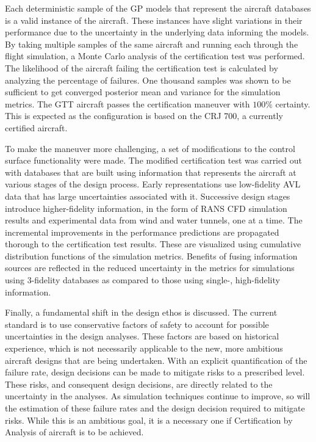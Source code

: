 Each deterministic sample of the GP models that represent the aircraft databases is a valid instance of the aircraft. 
These instances have slight variations in their performance due to the uncertainty in the underlying data informing the models.
By taking multiple samples of the same aircraft and running each through the flight simulation, a Monte Carlo analysis of the certification test was performed. 
The likelihood of the aircraft failing the certification test is calculated by analyzing the percentage of failures.
One thousand samples was shown to be sufficient to get converged posterior mean and variance for the simulation metrics. 
The GTT aircraft passes the certification maneuver with $100\%$ certainty.
This is expected as the configuration is based on the CRJ 700, a currently certified aircraft. 

To make the maneuver more challenging, a set of modifications to the control surface functionality were made.
The modified certification test was carried out with databases that are built using information that represents the aircraft at various stages of the design process.
Early representations use low-fidelity AVL data that has large uncertainties associated with it.
Successive design stages introduce higher-fidelity information, in the form of RANS CFD simulation results and experimental data from wind and water tunnels, one at a time.
The incremental improvements in the performance predictions are propagated thorough to the certification test results. 
These are visualized using cumulative distribution functions of the simulation metrics. 
Benefits of fusing information sources are reflected in the reduced uncertainty in the metrics for simulations using 3-fidelity databases as compared to those using single-, high-fidelity information.

Finally, a fundamental shift in the design ethos is discussed.
The current standard is to use conservative factors of safety to account for possible uncertainties in the design analyses.
These factors are based on historical experience, which is not necessarily applicable to the new, more ambitious aircraft designs that are being undertaken.
With an explicit quantification of the failure rate, design decisions can be made to mitigate risks to a prescribed level.
These risks, and consequent design decisions, are directly related to the uncertainty in the analyses.
As simulation techniques continue to improve, so will the estimation of these failure rates and the design decision required to mitigate risks.
While this is an ambitious goal, it is a necessary one if Certification by Analysis of aircraft is to be achieved. 


